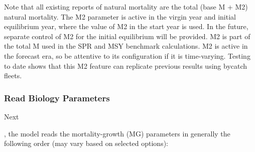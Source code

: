 Note that all existing reports of natural mortality are the total (base M + M2) natural mortality. The M2 parameter is active in the virgin year and initial equilibrium year, where the value of M2 in the start year is used. In the future, separate control of M2 for the initial equilibrium will be provided. M2 is part of the total M used in the SPR and MSY benchmark calculations. M2 is active in the forecast era, so be attentive to its configuration if it is time-varying. Testing to date shows that this M2 feature can replicate previous results using bycatch fleets.

\subsubsection{Read Biology Parameters}
\hypertarget{MGorder}{Next}, the model reads the mortality-growth (MG) parameters in generally the following order (may vary based on selected options):

